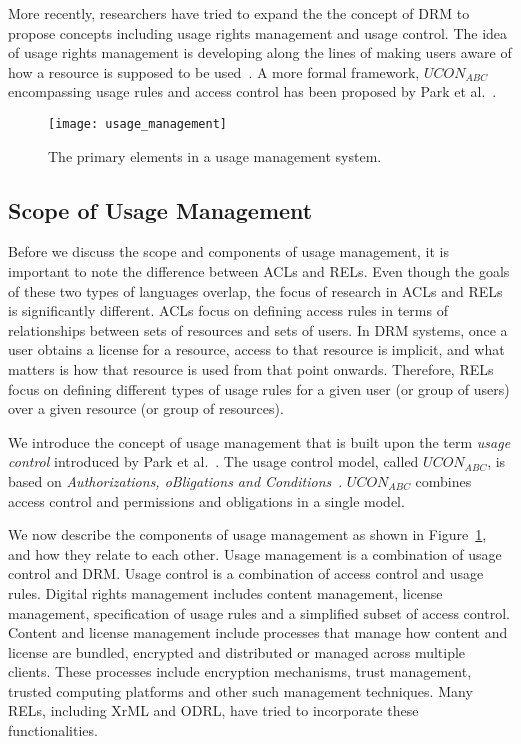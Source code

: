 More recently, researchers have tried to expand the the concept of DRM to propose concepts including usage rights management and usage control. The idea of usage rights management is developing along the lines of making users aware of how a resource is supposed to be used~\cite{HuPaGr:09}. A more formal framework, $UCON_{ABC}$ encompassing usage rules and access control has been proposed by Park et al.~\cite{PaSa:04}.

\begin{figure}[t]
 \centerline{\texttt{[image: usage\_management]}}
 \caption{The primary elements in a usage management system.} \label{UM}
\end{figure}

\subsection{Scope of Usage Management}
Before we discuss the scope and components of usage management, it is important to note the difference between ACLs and RELs. Even though the goals of these two types of languages overlap, the focus of research in ACLs and RELs is significantly different.  ACLs focus on defining access rules in terms of relationships between sets of resources and sets of users. In DRM systems, once a user obtains a license for a resource, access to that resource is implicit, and what matters is how that resource is used from that point onwards. Therefore, RELs  focus on defining different types of usage rules for a given user (or group of users) over a given resource (or group of resources). 

We introduce the concept of usage management that is built upon the term {\em usage control} introduced by Park et al.~\cite{PaSa:04}. The usage control model, called  $UCON_{ABC}$, is based on {\em Authorizations, oBligations and Conditions}~\cite{PaSa:04}. $UCON_{ABC}$ combines access control and  permissions and obligations in a single model. 

We now describe the components of usage management as shown in Figure~\ref{UM}, and how they relate to each other. Usage management is a combination of usage control and DRM.  Usage control is a combination of access control and usage rules. Digital rights management includes content management, license management, specification of usage rules and a simplified subset of access control.  Content and license management include processes that manage how content and license are bundled, encrypted and distributed or managed across multiple clients. These processes include encryption mechanisms, trust management, trusted computing platforms and other such management techniques. Many RELs, including XrML and ODRL, have tried to incorporate these functionalities. 

